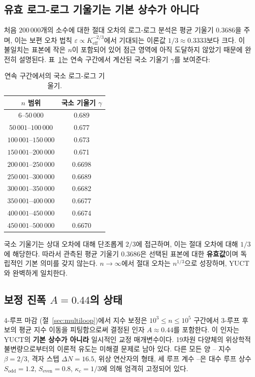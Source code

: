 \documentclass[11pt,a4paper]{article}
\begin{document}
	\subsection{유효 로그-로그 기울기는 기본 상수가 아니다}
	처음 \(200\,000\)개의 소수에 대한 절대 오차의 로그-로그 분석은 평균 기울기 \(0.3686\)을 주며, 이는 보편 오차 법칙 \(\varepsilon \propto K_{\mathrm{eff}}^{-2/3}\)에서 기대되는 이론값 \(1/3 \approx 0.3333\)보다 크다. 이 불일치는 표본에 작은 \(n\)이 포함되어 있어 점근 영역에 아직 도달하지 않았기 때문에 완전히 설명된다. 표~\ref{tab:local-slopes}는 연속 구간에서 계산된 국소 기울기 \(\gamma\)를 보여준다:
	\begin{table}[htbp]
		\centering
		\caption{연속 구간에서의 국소 로그-로그 기울기.}
		\label{tab:local-slopes}
		\begin{tabular}{c c}
			\toprule
			\(n\) 범위 & 국소 기울기 \(\gamma\) \\
			\midrule
			\(6\)--\(50\,000\)    & 0.689 \\
			\(50\,001\)--\(100\,000\) & 0.677 \\
			\(100\,001\)--\(150\,000\)& 0.673 \\
			\(150\,001\)--\(200\,000\)& 0.671 \\
			\(200\,001\)--\(250\,000\)& 0.6698 \\
			\(250\,001\)--\(300\,000\)& 0.6689 \\
			\(300\,001\)--\(350\,000\)& 0.6682 \\
			\(350\,001\)--\(400\,000\)& 0.6677 \\
			\(400\,001\)--\(450\,000\)& 0.6674 \\
			\(450\,001\)--\(500\,000\)& 0.6670 \\
			\bottomrule
		\end{tabular}
	\end{table}
	국소 기울기는 상대 오차에 대해 단조롭게 \(2/3\)에 접근하며, 이는 절대 오차에 대해 \(1/3\)에 해당한다. 따라서 관측된 평균 기울기 \(0.3686\)은 선택된 표본에 대한 \textbf{유효값}이며 독립적인 기본 의미를 갖지 않는다. \(n\to\infty\)에서 절대 오차는 \(n^{1/3}\)으로 성장하며, YUCT와 완벽하게 일치한다.
	
	\subsection{보정 진폭 \(A=0.44\)의 상태}
	4-루프 마감 (절~\ref{sec:multiloop})에서 지수 보정은 \(10^3\le n\le 10^5\) 구간에서 3-루프 후보의 평균 지수 이동을 피팅함으로써 결정된 인자 \(A \approx 0.44\)를 포함한다. 이 인자는 YUCT의 \textbf{기본 상수가 아니라} 일시적인 교정 매개변수이다. 19차원 다양체의 위상학적 불변량으로부터의 이론적 유도는 미해결 문제로 남아 있다. 다른 모든 양 – 지수 \(\beta=2/3\), 격자 스텝 \(\Delta N=16.5\), 위상 연산자의 형태, 세 루프 계수 –은 대수 루프 상수 \(S_{\mathrm{odd}}=1.2\), \(S_{\mathrm{even}}=0.8\), \(\kappa_c=1/3\)에 의해 엄격히 고정되어 있다.
	
\end{document}
